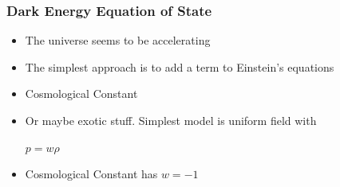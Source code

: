 \documentclass{beamer}
\begin{document}
\frame
{
    \frametitle{Dark Energy Equation of State}

 
    \begin{itemize}

        \item The universe seems to be accelerating

        \item The simplest approach is to add a term to Einstein's equations

        \item Cosmological Constant

        \item Or maybe exotic stuff.  Simplest model is uniform field with

       \vspace{5 mm}
        \begin{center}
            {\color{gold}
                {\huge $p = w \rho$}
            }
        \end{center}
       \vspace{5 mm}

        \item Cosmological Constant has $w=-1$

    \end{itemize}

}
\end{document}
